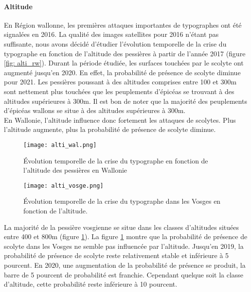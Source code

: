 \paragraph{Altitude}
En Région wallonne, les premières attaques importantes de typographes ont été signalées en 2016. La qualité des images satellites pour 2016 n'étant pas suffisante, nous avons décidé d'étudier l'évolution temporelle de la crise du typographe en fonction de l'altitude des pessières à partir de l'année 2017 (figure \ref{fig: alti_rw}). 
Durant la période étudiée, les surfaces touchées par le scolyte ont augmenté jusqu'en 2020. En effet, la probabilité de présence de scolyte diminue pour 2021.
Les pessières poussant à des altitudes comprises entre 100 et 300m sont nettement plus touchées que les peuplements d'épicéas se trouvant à des altitudes supérieures à 300m. 
Il est bon de noter que la majorité des peuplements d'épicéas wallons se situe à des altitudes supérieures à 300m.\\ 
En Wallonie, l'altitude influence donc fortement les attaques de scolytes. Plus l'altitude augmente, plus la probabilité de présence de scolyte diminue. \\

\begin{figure}[htbp]
	\begin{minipage}[b]{1 \linewidth}
		\centering
		\texttt{[image: alti\_wal.png]}
		\caption{Évolution temporelle de la crise du typographe en fonction de l'altitude des pessières en Wallonie }
		\label{fig: alti_rw}
		
	\end{minipage}\hfill
	\vspace{0.75cm}
	\begin{minipage}[b]{1 \linewidth}
		\centering
		\texttt{[image: alti\_vosge.png]}
		\caption{Évolution temporelle de la crise du typographe dans les Vosges en fonction de l'altitude.}
		\label{fig: alti_vosges}
	\end{minipage}
\end{figure}




La majorité de la pessière vosgienne se situe dans les classes d'altitudes situées entre 400 et 800m (figure \ref{fig: alti_vosges}).
La figure \ref{fig: alti_vosges} montre que la probabilité de présence de scolyte dans les Vosges ne semble pas influencée par l'altitude. Jusqu'en 2019, la probabilité de présence de scolyte reste relativement stable et inférieure à 5 pourcent. En 2020, une augmentation de la probabilité de présence se produit, la barre de 5 pourcent de probabilité est franchie. Cependant quelque soit la classe d'altitude, cette probabilité reste inférieure à 10 pourcent.


